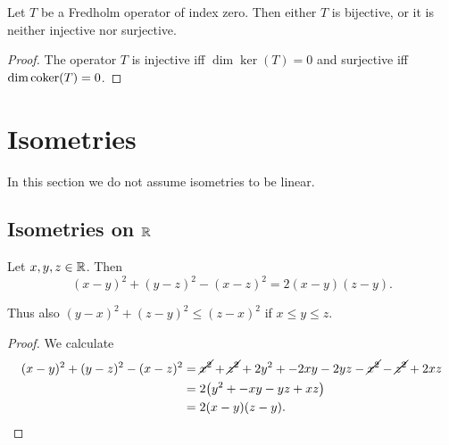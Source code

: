 \begin{lemma} \label{FredholmAlternative}
Let $T$ be a Fredholm operator of index zero. Then either $T$ is bijective, or it is neither injective nor surjective.
\end{lemma}
\begin{proof}
The operator $T$ is injective iff $\dim\ker(T) = 0$ and surjective iff $\dim\operatorname{coker}(T) = 0$.
\end{proof}



\section{Isometries}
In this section we do not assume isometries to be linear.

\subsection{Isometries on $\mathbb{R}$}
\begin{lemma} \label{sumSquaredIntervals}
Let $x,y,z\in\mathbb{R}$. Then
\[ (x-y)^2 + (y-z)^2 - (x-z)^2 = 2(x-y)(z-y). \]
\end{lemma}
Thus also $(y-x)^2 + (z-y)^2 \leq (z-x)^2$ if $x\leq y\leq z$.
\begin{proof}
We calculate
\begin{align*}
(x-y)^2 + (y-z)^2 - (x-z)^2 &= \cancel{x^2} + \cancel{z^2} + 2y^2 + -2xy-2yz -\cancel{x^2} -\cancel{z^2} + 2xz \\
&= 2\big(y^2 + -xy-yz + xz\big) \\
&= 2(x-y)(z-y).
\end{align*}
\end{proof}

